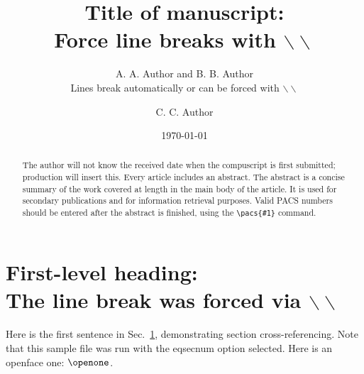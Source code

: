 %
%
%
%
%
%
\def\btt#1{{\tt$\backslash$#1}}
\def\BibTeX{\rm B{\sc ib}\TeX}

\draft
{}
\title{Title of manuscript:\\
Force line breaks with $\backslash\backslash$
}
\author{A. A.  Author and B. B. Author\cite{byline}\\
Lines break automatically or can be forced
with $\backslash\backslash$}
\address{
Authors' institution and/or address\\
This line break forced with $\backslash\backslash$
}
\author{C. C. Author}
\address{
Second author institution and/or address\\
This line break forced with $\backslash\backslash$
}
\date{\today}
\maketitle
\begin{abstract}
The author will not know the received date when the compuscript
is first submitted; production will insert this. Every
article includes an abstract.  The abstract is a concise
summary of the work covered at length
in the main body of the article.
It is used for secondary publications and for information retrieval
purposes. Valid PACS numbers should be entered after the abstract
is finished, using the \verb+\pacs{#1}+ command.
\end{abstract}

\narrowtext

\section{First-level heading:\protect\\ The line break was forced via
$\backslash\backslash$}
\label{sec:level1}

Here is the first sentence in Sec.\ \ref{sec:level1}, demonstrating
section cross-referencing. Note that this sample file was run
with the eqsecnum option selected.
Here is an openface one: $\openone$.

